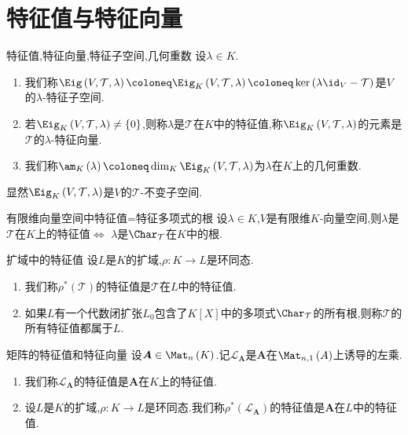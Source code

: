 \section{特征值与特征向量}

\begin{definition}{特征值,特征向量,特征子空间,几何重数}{}
	设$\lambda\in K$.
	\begin{enumerate}
		\item 我们称$\Eig\left(V,\mathcal{T},\lambda\right)\coloneq\Eig_{K}\left(V,\mathcal{T},\lambda\right)\coloneq\ker\left(\lambda\id_{V}-\mathcal{T}\right)$是$V$的$\lambda$-特征子空间.
		\item 若$\Eig_{K}\left(V,\mathcal{T},\lambda\right)\neq\left\{0\right\}$,则称$\lambda$是$\mathcal{T}$在$K$中的特征值,称$\Eig_{K}\left(V,\mathcal{T},\lambda\right)$的元素是$\mathcal{T}$的$\lambda$-特征向量.
		\item 我们称$\am_{K}\left(\lambda\right)\coloneq\dim_{K}\Eig_{K}\left(V,\mathcal{T},\lambda\right)$为$\lambda$在$K$上的几何重数.
	\end{enumerate}
\end{definition}

\begin{remark}{}{}
	显然$\Eig_{K}\left(V,\mathcal{T},\lambda\right)$是$V$的$\mathcal{T}$-不变子空间.
\end{remark}

\begin{proposition}{有限维向量空间中特征值=特征多项式的根}{}
	设$\lambda\in K$,$V$是有限维$K$-向量空间,则$\lambda$是$\mathcal{T}$在$K$上的特征值$\iff$ $\lambda$是$\Char_{\mathcal{T}}$在$K$中的根.
\end{proposition}

\begin{definition}{扩域中的特征值}{}
	设$L$是$K$的扩域,$\rho:K\to L$是环同态.
	\begin{enumerate}
		\item 我们称$\rho^{\ast}\left(\mathcal{T}\right)$的特征值是$\mathcal{T}$在$L$中的特征值.
		\item 如果$L$有一个代数闭扩张$L_{0}$包含了$K[X]$中的多项式$\Char_{\mathcal{T}}$的所有根,则称$\mathcal{T}$的所有特征值都属于$L$.
	\end{enumerate}
\end{definition}

\begin{definition}{矩阵的特征值和特征向量}{}
	设$\boldsymbol{A}\in\Mat_{n}\left(K\right)$.记$\mathcal{L}_{\boldsymbol{A}}$是$\boldsymbol{A}$在$\Mat_{n,1}\left(A\right)$上诱导的左乘.
	\begin{enumerate}
		\item 我们称$\mathcal{L}_{\boldsymbol{A}}$的特征值是$\boldsymbol{A}$在$K$上的特征值.
		\item 设$L$是$K$的扩域,$\rho:K\to L$是环同态.我们称$\rho^{\ast}\left(\mathcal{L}_{\boldsymbol{A}}\right)$的特征值是$\boldsymbol{A}$在$L$中的特征值.
	\end{enumerate}
\end{definition}

